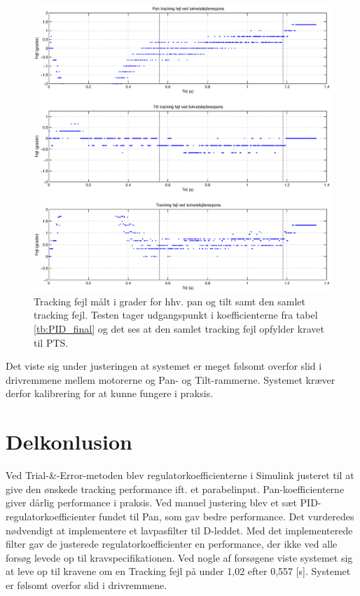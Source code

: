 \begin{figure}[h!]
\centering
\includegraphics[width=1\textwidth]{./graphics/error_slut.eps}
\caption[Endelig regulator koefficienter]{Tracking fejl målt i grader for hhv. pan og tilt samt den samlet tracking fejl. Testen tager udgangspunkt i koefficienterne fra  tabel \ref{tb:PID_final} og det ses at den samlet tracking fejl opfylder kravet til PTS.} 
\label{fig:PID_final}
\end{figure}

Det viste sig under justeringen at systemet er meget følsomt overfor slid i drivremmene mellem motorerne og Pan- og Tilt-rammerne.
Systemet kræver derfor kalibrering for at kunne fungere i praksis.

\section{Delkonlusion}
Ved Trial-\&-Error-metoden blev regulatorkoefficienterne i Simulink justeret til at give den ønskede 
tracking performance ift. et parabelinput. Pan-koefficienterne giver dårlig performance i praksis.
Ved manuel justering blev et sæt PID-regulatorkoefficienter fundet til Pan, som gav bedre performance.
Det vurderedes nødvendigt at implementere et lavpasfilter til D-leddet.
Med det implementerede filter gav de justerede regulatorkoefficienter en performance,
der ikke ved alle forsøg levede op til kravspecifikationen. Ved nogle af forsøgene viste
systemet sig at leve op til kravene om en Tracking fejl på under 1,02 \degree{} efter 0,557 [s].
Systemet er følsomt overfor slid i drivremmene.